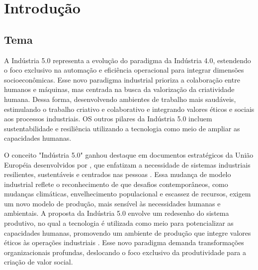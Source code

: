 

\chapter{Introdução}\label{cap:introducao}

\section{Tema}
A Indústria 5.0 representa a evolução do paradigma da Indústria 4.0, estendendo o foco exclusivo na automação e eficiência operacional para integrar dimensões socioeconômicas. Esse novo paradigma industrial prioriza a colaboração entre humanos e máquinas, mas centrada na busca da valorização da criatividade humana. Dessa forma, desenvolvendo ambientes de trabalho mais saudáveis, estimulando o trabalho criativo e colaborativo e integrando valores éticos e sociais aos processos industriais. OS outros pilares da Indústria 5.0 incluem sustentabilidade e resiliência utilizando a tecnologia como meio de ampliar as capacidades humanas. %

O conceito "Indústria 5.0" ganhou destaque em documentos estratégicos da União Européia desenvolvidos por , que enfatizam a necessidade de sistemas industriais resilientes, sustentáveis e centrados nas pessoas . Essa mudança de modelo industrial reflete o reconhecimento de que desafios contemporâneos, como mudanças climáticas, envelhecimento populacional e escassez de recursos, exigem um novo modelo de produção, mais sensível às necessidades humanas e ambientais. A proposta da Indústria 5.0 envolve um redesenho do sistema produtivo, no qual a tecnologia é utilizada como meio para potencializar as capacidades humanas, promovendo um ambiente de produção que integre valores éticos às operações industriais . Esse novo paradigma demanda transformações organizacionais profundas, deslocando o foco exclusivo da produtividade para a criação de valor social. %

